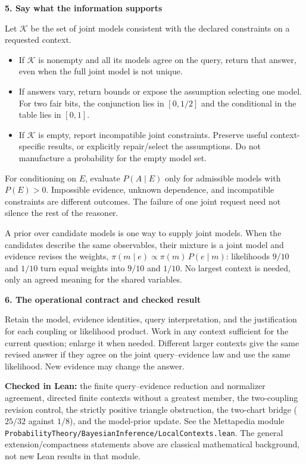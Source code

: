 \documentclass[11pt]{article}
\newcommand{\heading}[1]{\vspace{4pt}\textbf{#1}\par\nopagebreak}
\begin{document}
\heading{5. Say what the information supports}
Let $\mathcal K$ be the set of joint models consistent with the declared
constraints on a requested context.
\begin{itemize}
\setlength{\itemsep}{0pt}
\item If $\mathcal K$ is nonempty and all its models agree on the query, return that answer,
      even when the full joint model is not unique.
\item If answers vary, return bounds or expose the assumption selecting one
      model. For two fair bits, the conjunction lies in $[0,1/2]$ and the
      conditional in the table lies in $[0,1]$.
\item If $\mathcal K$ is empty, report incompatible joint constraints.
      Preserve useful context-specific results, or explicitly repair/select
      the assumptions. Do not manufacture a probability for the empty model set.
\end{itemize}
For conditioning on $E$, evaluate $P(A\mid E)$ only for admissible models
with $P(E)>0$. Impossible evidence, unknown dependence, and incompatible
constraints are different outcomes. The failure of one joint request need not
silence the rest of the reasoner.

A prior over candidate models is one way to supply joint models. When the
candidates describe the same observables, their mixture is a joint model and
evidence revises the weights, $\pi(m\mid e)\propto\pi(m)\,P(e\mid m)$:
likelihoods $9/10$ and $1/10$ turn equal weights into $9/10$ and $1/10$. No
largest context is needed, only an agreed meaning for the shared variables.

\heading{6. The operational contract and checked result}
Retain the model, evidence identities, query interpretation, and the
justification for each coupling or likelihood product. Work in any context sufficient for
the current question; enlarge it when needed. Different larger contexts give
the same revised answer if they agree on the joint query--evidence law and
use the same likelihood. New evidence may change the answer.

\textbf{Checked in Lean:} the finite query--evidence reduction and normalizer
agreement, directed finite contexts without a greatest member, the two-coupling
revision control, the strictly positive triangle obstruction, the two-chart
bridge ($25/32$ against $1/8$), and the model-prior update. See the Mettapedia module
\texttt{ProbabilityTheory/\allowbreak BayesianInference/\allowbreak LocalContexts.lean}.
The general extension/compactness statements above are classical mathematical
background, not new Lean results in that module.
\end{document}

